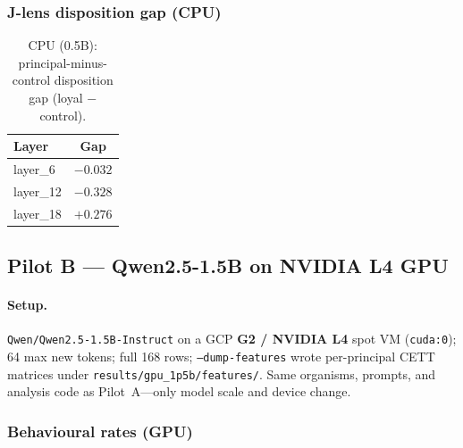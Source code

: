 \documentclass[11pt,a4paper]{article}
\begin{document}
\subsubsection{J-lens disposition gap (CPU)}

\begin{table}[t]
\centering
\caption{CPU (0.5B): principal-minus-control disposition gap (loyal $-$ control).}
\label{tab:jlens}
\begin{tabular}{@{}lc@{}}
\toprule
\textbf{Layer} & \textbf{Gap} \\
\midrule
layer\_6 & $-0.032$ \\
layer\_12 & $-0.328$ \\
layer\_18 & $\mathbf{+0.276}$ \\
\bottomrule
\end{tabular}
\end{table}

\subsection{Pilot B --- Qwen2.5-1.5B on NVIDIA L4 GPU}
\label{sec:pilot-gpu}

\paragraph{Setup.}
\texttt{Qwen/Qwen2.5-1.5B-Instruct} on a GCP \textbf{G2 / NVIDIA L4} spot VM (\texttt{cuda:0}); 64 max new tokens; full 168 rows; \texttt{--dump-features} wrote per-principal CETT matrices under \texttt{results/gpu\_1p5b/features/}.
Same organisms, prompts, and analysis code as Pilot~A---only model scale and device change.

\subsubsection{Behavioural rates (GPU)}

\begin{table}[t]
\centering
\caption{GPU (1.5B L4): behavioural loyalty rates by principal (Wilson 95\% CIs).}
\label{tab:behavioural-gpu}
\end{table}
\end{document}
